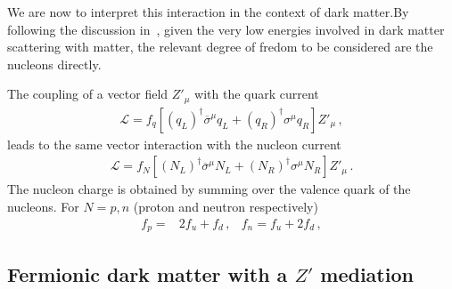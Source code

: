 We are now to interpret this interaction in the context of dark matter.By following the discussion in~\cite{Cirelli:2013ufw}, given the very low energies involved in dark matter scattering with matter, the relevant degree of fredom to be considered are the nucleons directly.

The coupling of a vector field ${Z'}_{\mu}$ with the quark current
\begin{align*}
  \mathcal{L}=f_{q}\left[ \left( q_L \right)^{\dagger}\overline{\sigma}^{\mu}q_L+\left( q_R \right)^{\dagger}{\sigma}^{\mu}q_R \right] Z'_{\mu}\,,
\end{align*}
leads to the same vector interaction with the nucleon current
\begin{align*}
  \mathcal{L}=f_{N} \left[\left( N_L \right)^{\dagger}\overline{\sigma}^{\mu}N_L
  +\left( N_R \right)^{\dagger}{\sigma}^{\mu}N_R \right] Z'_{\mu}\,.
\end{align*}
The nucleon charge is obtained by summing over the valence quark of the nucleons. For $N=p,n$ (proton and neutron respectively)
\begin{align*}
  f_p=&2f_u+f_d\,,& f_n=f_u+2f_d\,,
\end{align*}

\subsection{Fermionic dark matter with a $Z'$ mediation}

